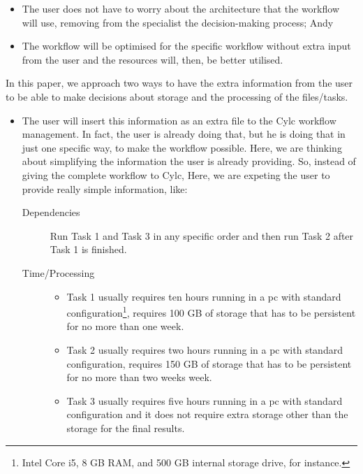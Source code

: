 \documentclass[a4paper, twocolumn]{article}
\begin{document}
\begin{itemize}

\item The user does not have to worry about the architecture that the workflow will use, removing from the specialist the decision-making process; Andy

\item The workflow will be optimised for the specific workflow without extra input from the user and the resources will, then, be better utilised.

\end{itemize}

In this paper, we approach two ways to have the extra information from the user to be able to make decisions about storage and the processing of the files/tasks.

\begin{itemize}

\item The user will insert this information as an extra file to the Cylc workflow management. In fact, the user is already doing that, but he is doing that in just one specific way, to make the workflow possible. Here, we are thinking about simplifying the information the user is already providing. So, instead of giving the complete workflow to Cylc, Here, we are expeting the user to provide really simple information, like:

\begin{description}

\item[Dependencies] Run Task 1 and Task 3 in any specific order and then run Task 2 after Task 1 is finished.

\item[Time/Processing]

\begin{itemize}

\item Task 1 usually requires ten hours running in a pc with standard configuration\footnote{Intel Core i5, 8 GB RAM, and 500 GB internal storage drive, for instance.}, requires 100 GB of storage that has to be persistent for no more than one week.

\item Task 2 usually requires two hours running in a pc with standard configuration, requires 150 GB of storage that has to be persistent for no more than two weeks week.

\item Task 3 usually requires five hours running in a pc with standard configuration and it does not require extra storage other than the storage for the final results.


\end{itemize}
\end{description}
\end{itemize}
\end{document}
